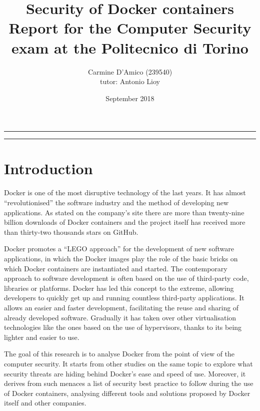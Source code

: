 \documentclass[a4paper,12pt]{article}
\begin{document}
\title{Security of Docker containers \\
{\normalsize Report for the Computer Security exam at the Politecnico di Torino}
} \author{Carmine D'Amico (239540) \\
{\normalsize tutor: Antonio Lioy} }
\date{September 2018}
\maketitle

\vfill

\rule{\textwidth}{1pt}

\tableofcontents

\rule{\textwidth}{1pt}

\vfill

\newpage

\section{Introduction}

Docker is one of the most disruptive technology of the last years. It has almost
``revolutionised'' the software industry and the method of developing new
applications. As stated on the company's site \cite{docker_numbers} there are
more than twenty-nine billion downloads of Docker containers and the project
itself has received more than thirty-two thousands stars on GitHub. \par Docker
promotes a ``LEGO approach'' for the development of new software applications,
in which the Docker images play the role of the basic bricks on which Docker
containers are instantiated and started. The contemporary approach to software
development is often based on the use of third-party code, libraries or
platforms. Docker has led this concept to the extreme, allowing developers to
quickly get up and running countless third-party applications. It allows an
easier and faster development, facilitating the reuse and sharing of already
developed software. Gradually it has taken over other virtualisation
technologies like the ones based on the use of hypervisors, thanks to its being
lighter and easier to use. \par The goal of this research is to analyse Docker
from the point of view of the computer security. It starts from other studies on
the same topic to explore what security threats are hiding behind Docker's ease
and speed of use. Moreover, it derives from such menaces a list of security best
practice to follow during the use of Docker containers, analysing different
tools and solutions proposed by Docker itself and other companies. 
\end{document}

